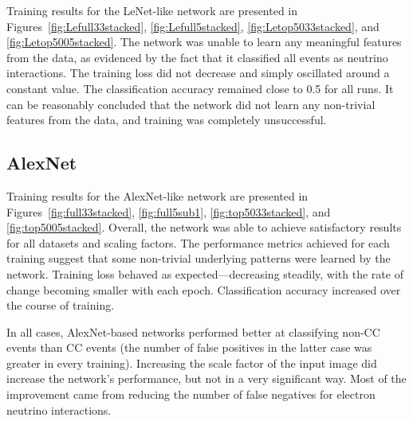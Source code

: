 \documentclass{pracalicmgr}
\begin{document}
\newpage

Training results for the LeNet-like network are presented in Figures~\ref{fig:Lefull33stacked}, \ref{fig:Lefull5stacked}, \ref{fig:Letop5033stacked}, and \ref{fig:Letop5005stacked}. The network was unable to learn any meaningful features from the data, as evidenced by the fact that it classified all events as neutrino interactions. The training loss did not decrease and simply oscillated around a constant value. The classification accuracy remained close to 0.5 for all runs. It can be reasonably concluded that the network did not learn any non-trivial features from the data, and training was completely unsuccessful.

\subsection{AlexNet}

Training results for the AlexNet-like network are presented in Figures~\ref{fig:full33stacked}, \ref{fig:full5sub1}, \ref{fig:top5033stacked}, and \ref{fig:top5005stacked}. Overall, the network was able to achieve satisfactory results for all datasets and scaling factors. The performance metrics achieved for each training suggest that some non-trivial underlying patterns were learned by the network. Training loss behaved as expected—decreasing steadily, with the rate of change becoming smaller with each epoch. Classification accuracy increased over the course of training.

In all cases, AlexNet-based networks performed better at classifying non-CC events than CC events (the number of false positives in the latter case was greater in every training). Increasing the scale factor of the input image did increase the network's performance, but not in a very significant way. Most of the improvement came from reducing the number of false negatives for electron neutrino interactions.
\end{document}
